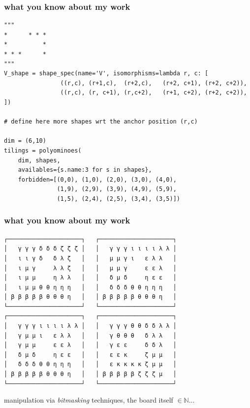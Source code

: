 \documentclass[9pt]{beamer}
\begin{document}
\begin{frame}[fragile]
\frametitle{what you know about my work}

\begin{verbatim}
"""
*      * * *   
*          *   
* * *      *   
"""
V_shape = shape_spec(name='V', isomorphisms=lambda r, c: [
                ((r,c), (r+1,c),  (r+2,c),   (r+2, c+1), (r+2, c+2)),
                ((r,c), (r, c+1), (r,c+2),   (r+1, c+2), (r+2, c+2)), ])

# define here more shapes wrt the anchor position (r,c)

dim = (6,10)
tilings = polyominoes(
    dim, shapes,
    availables={s.name:3 for s in shapes},
    forbidden=[(0,0), (1,0), (2,0), (3,0), (4,0),
               (1,9), (2,9), (3,9), (4,9), (5,9),
               (1,5), (2,4), (2,5), (3,4), (3,5)])
\end{verbatim}
\end{frame}

\begin{frame}[fragile]
\frametitle{what you know about my work}
\begin{Verbatim}[baselinestretch=0.1, fontsize=\footnotesize]
┌─────────────────────┐   ┌─────────────────────┐
│   γ γ γ δ δ δ ζ ζ ζ │   │   γ γ γ ι ι ι ι λ λ │
│   ι ι γ δ   δ λ ζ   │   │   μ μ γ ι   ε λ λ   │
│   ι μ γ     λ λ ζ   │   │   μ μ γ     ε ε λ   │
│   ι μ μ     η λ λ   │   │   δ μ δ     η ε ε   │
│   ι μ μ θ θ η η η   │   │   δ δ δ θ θ η η η   │
│ β β β β β θ θ θ η   │   │ β β β β β θ θ θ η   │
└─────────────────────┘   └─────────────────────┘
┌─────────────────────┐   ┌─────────────────────┐
│   γ γ γ ι ι ι ι λ λ │   │   γ γ γ θ θ δ δ λ λ │
│   γ μ μ ι   ε λ λ   │   │   γ θ θ θ   δ λ λ   │
│   γ μ μ     ε ε λ   │   │   γ ε ε     δ δ λ   │
│   δ μ δ     η ε ε   │   │   ε ε κ     ζ μ μ   │
│   δ δ δ θ θ η η η   │   │   ε κ κ κ κ ζ μ μ   │
│ β β β β β θ θ θ η   │   │ β β β β β ζ ζ ζ μ   │
└─────────────────────┘   └─────────────────────┘
\end{Verbatim}
manipulation via \textit{bitmasking} techniques, the board itself $\in\mathbb{N}$...
\end{frame}
\end{document}
